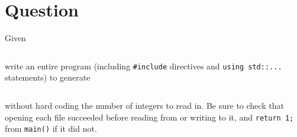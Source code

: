 




\docCopyright

\section{Question}

Given

\inputminted[label={input.txt}]{text}{\docCodeDir/input.txt}

write an entire program (including \texttt{#include} directives and
\texttt{using std::...} statements) to generate

\inputminted[label={output.gen.txt}]{text}{\docCodeDir/output.gen.txt}

without hard coding the number of integers to read in.  Be sure to check that
opening each file succeeded before reading from or writing to it, and
\texttt{return 1;} from \texttt{main()} if it did not.




